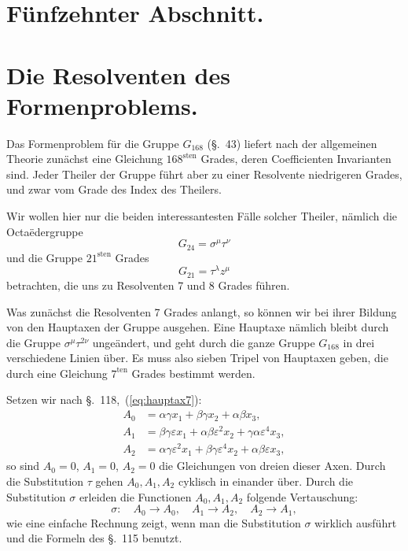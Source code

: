 \documentclass[12pt,a4paper]{article}
\begin{document}
\newpage
\section*{F\"unfzehnter Abschnitt.}

\section{Die Resolventen des Formenproblems.}
\label{sec:125}

Das Formenproblem f\"ur die Gruppe $G_{168}$ (\S.~43) liefert nach der allgemeinen Theorie zun\"achst eine Gleichung $168^{\text{sten}}$ Grades, deren Coefficienten Invarianten sind. Jeder Theiler der Gruppe f\"uhrt aber zu einer Resolvente niedrigeren Grades, und zwar vom Grade des Index des Theilers.

Wir wollen hier nur die beiden interessantesten F\"alle solcher Theiler, n\"amlich die Octa\"edergruppe
\begin{equation}
\label{eq:octa} G_{24} = \sigma^{\mu} \tau^{\nu}
\end{equation}
und die Gruppe $21^{\text{sten}}$ Grades
\begin{equation}
\label{eq:gr21} G_{21} = \tau^{\lambda} z^{\mu}
\end{equation}
betrachten, die uns zu Resolventen 7 und 8 Grades f\"uhren.

Was zun\"achst die Resolventen 7 Grades anlangt, so k\"onnen wir bei ihrer Bildung von den Hauptaxen der Gruppe ausgehen. Eine Hauptaxe n\"amlich bleibt durch die Gruppe $\sigma^{\mu}\tau^{2\nu}$ unge\"andert, und geht durch die ganze Gruppe $G_{168}$ in drei verschiedene Linien \"uber. Es muss also sieben Tripel von Hauptaxen geben, die durch eine Gleichung $7^{\text{ten}}$ Grades bestimmt werden.

Setzen wir nach \S.~118,~(\ref{eq:hauptax7}):
\begin{equation}
\label{eq:Aset} \begin{aligned}
A_0 &= \alpha\gamma x_1 + \beta\gamma x_2 + \alpha\beta x_3,\\
A_1 &= \beta\gamma\varepsilon x_1 + \alpha\beta\varepsilon^2 x_2 + \gamma\alpha\varepsilon^4 x_3,\\
A_2 &= \alpha\gamma\varepsilon^2 x_1 + \beta\gamma\varepsilon^4 x_2 + \alpha\beta\varepsilon x_3,\end{aligned}
\end{equation}
so sind $A_0 = 0$, $A_1 = 0$, $A_2 = 0$ die Gleichungen von dreien dieser Axen. Durch die Substitution $\tau$ gehen $A_0, A_1, A_2$ cyklisch in einander \"uber. Durch die Substitution $\sigma$ erleiden die Functionen $A_0, A_1, A_2$ folgende Vertauschung:
\[\sigma: \quad A_0 \to A_0, \quad A_1 \to A_2, \quad A_2 \to A_1,\]
wie eine einfache Rechnung zeigt, wenn man die Substitution $\sigma$ wirklich ausf\"uhrt und die Formeln des \S.~115 benutzt.
\end{document}
